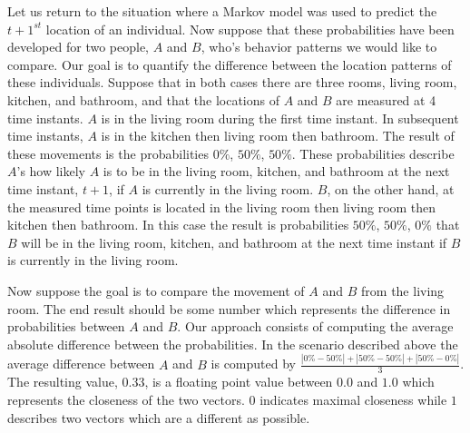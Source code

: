 Let us return to the situation where
a Markov model was used to predict the $t+1^{st}$ location
of an individual.
Now suppose that these probabilities have been developed for
two people, $A$ and $B$, who's behavior patterns we would like to
compare.
Our goal is to quantify the difference between
the location patterns of these individuals.
Suppose that in both cases there are three rooms,
living room, kitchen, and bathroom, and
that the locations of $A$ and $B$ are measured at 4 time instants.
%
$A$ is in the living room during the first time instant.
In subsequent time instants,
$A$ is in the kitchen then living room then bathroom.
The result of these movements is 
the probabilities $0\%$, $50\%$, $50\%$.
These probabilities describe $A$'s how likely
$A$ is to be in the
living room, kitchen, and bathroom at the next time instant, $t+1$,
if $A$ is currently in the living room.
%
$B$, on the other hand,
at the measured time points is located in
the living room then living room then kitchen then bathroom.
In this case the
result is probabilities $50\%$, $50\%$, $0\%$ 
that $B$ will be in the
living room, kitchen, and bathroom at the next time instant
if $B$ is currently in the living room.
%

Now suppose the goal is to compare the 
movement of $A$ and $B$ from the living room.
The end result should be some number which represents
the difference in probabilities between $A$ and $B$.
%
Our approach consists of computing
the average absolute difference between the probabilities.
%
In the scenario described above
the average difference between $A$ and $B$ 
is computed by
$\frac{|0\%-50\%| + |50\%-50\%| + |50\%-0\%|}{3}$.
The resulting value, $0.33$, is a floating point value
between $0.0$ and $1.0$ which represents
the closeness of the two vectors.
$0$ indicates maximal closeness while
$1$ describes two vectors which are a different as possible.
%

